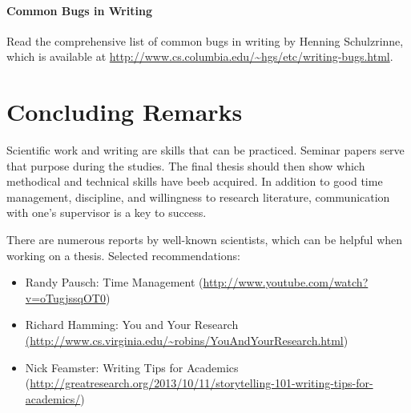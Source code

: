 \paragraph{Common Bugs in Writing}
\label{par:commonbugs}
Read the comprehensive list of common bugs in writing by Henning Schulzrinne, which is available at \url{http://www.cs.columbia.edu/~hgs/etc/writing-bugs.html}.

\section{Concluding Remarks}

Scientific work and writing are skills that can be practiced. Seminar papers serve that purpose during the studies. The final thesis should then show which methodical and technical skills have beeb acquired. In addition to good time management, discipline, and willingness to research literature, communication with one's supervisor is a key to success.

There are numerous reports by well-known scientists, which can be helpful when working on a thesis. Selected recommendations:

\begin{itemize}
\item Randy Pausch: Time Management (\url{http://www.youtube.com/watch?v=oTugjssqOT0})
\item Richard Hamming: You and Your Research \url{(http://www.cs.virginia.edu/~robins/YouAndYourResearch.html})
\item Nick Feamster: Writing Tips for Academics (\url{http://greatresearch.org/2013/10/11/storytelling-101-writing-tips-for-academics/})
\end{itemize}

